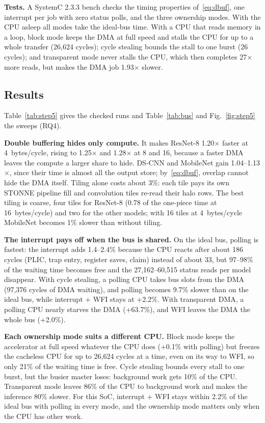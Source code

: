 \documentclass[conference]{IEEEtran}
\begin{document}
\textbf{Tests.} A SystemC 2.3.3 bench checks the timing properties of~\eqref{eq:dbuf}, one interrupt per job with zero status polls, and the three ownership modes. With the CPU asleep all modes take the ideal-bus time. With a CPU that reads memory in a loop, block mode keeps the DMA at full speed and stalls the CPU for up to a whole transfer (26{,}624 cycles); cycle stealing bounds the stall to one burst (26 cycles); and transparent mode never stalls the CPU, which then completes 27$\times$ more reads, but makes the DMA job 1.93$\times$ slower.



\subsection{Results}
Table~\ref{tab:step5} gives the checked runs and Table~\ref{tab:bus} and Fig.~\ref{fig:step5} the sweeps (RQ4).

\textbf{Double buffering hides only compute.} It makes ResNet-8 1.20$\times$ faster at 4~bytes/cycle, rising to 1.25$\times$ and 1.28$\times$ at 8 and 16, because a faster DMA leaves the compute a larger share to hide. DS-CNN and MobileNet gain 1.04--1.13$\times$, since their time is almost all the output store; by~\eqref{eq:dbuf}, overlap cannot hide the DMA itself. Tiling alone costs about 3\%: each tile pays its own STONNE pipeline fill and convolution tiles re-read their halo rows. The best tiling is coarse, four tiles for ResNet-8 (0.78 of the one-piece time at 16~bytes/cycle) and two for the other models; with 16 tiles at 4~bytes/cycle MobileNet becomes 1\% slower than without tiling.

\textbf{The interrupt pays off when the bus is shared.} On the ideal bus, polling is fastest: the interrupt adds 1.4--2.4\% because the CPU reacts after about 186 cycles (PLIC, trap entry, register saves, claim) instead of about 33, but 97--98\% of the waiting time becomes free and the 27{,}162--60{,}515 status reads per model disappear. With cycle stealing, a polling CPU takes bus slots from the DMA (97{,}376 cycles of DMA waiting), and polling becomes 9.7\% slower than on the ideal bus, while interrupt + WFI stays at +2.2\%. With transparent DMA, a polling CPU nearly starves the DMA (+63.7\%), and WFI leaves the DMA the whole bus (+2.0\%).

\textbf{Each ownership mode suits a different CPU.} Block mode keeps the accelerator at full speed whatever the CPU does (+0.1\% with polling) but freezes the cacheless CPU for up to 26{,}624 cycles at a time, even on its way to WFI, so only 21\% of the waiting time is free. Cycle stealing bounds every stall to one burst, but the busier master loses: background work gets 10\% of the CPU. Transparent mode leaves 86\% of the CPU to background work and makes the inference 80\% slower. For this SoC, interrupt + WFI stays within 2.2\% of the ideal bus with polling in every mode, and the ownership mode matters only when the CPU has other work.
\end{document}
